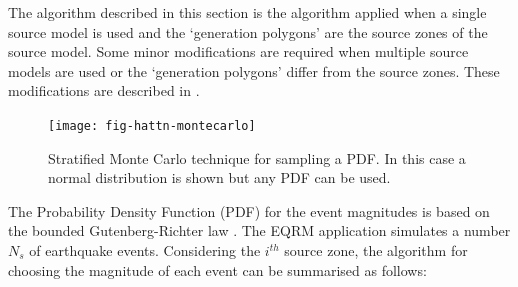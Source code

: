 The algorithm described in this section is the algorithm applied
when a single source model is used and the `generation
polygons' are the source zones of the
source model. Some minor modifications are required when multiple
source models are used or the `generation
polygons' differ from the source zones.
These modifications are described in .


\begin{figure}[htp]
\texttt{[image: fig-hattn-montecarlo]}
\caption{Stratified Monte Carlo technique for sampling a PDF. In
this case a normal distribution is shown but any PDF can be used.}
\label{fig-hattn-montecarlo}
\end{figure}

The Probability Density Function (PDF) for the event magnitudes is
based on the bounded Gutenberg-Richter law \citep{dr_Kramer96a}.
The EQRM application simulates a number $N_s$ of earthquake
events. Considering the $i^{th}$ source zone, the algorithm for
choosing the magnitude of each event can be summarised as follows:

